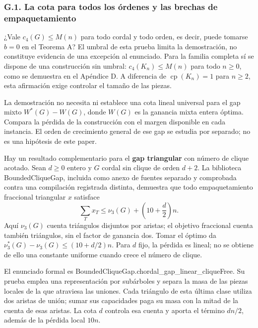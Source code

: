 \documentclass[spanish,11pt,a4paper]{article}
\begin{document}
\subsubsection{G.1. La cota para todos los órdenes y las brechas de empaquetamiento}\label{g.1.-la-cota-para-todos-los-ordenes-y-las-brechas-de-empaquetamiento}

¿Vale \(c_4(G)\le M(n)\) para todo cordal y todo orden, es decir, puede tomarse \(b=0\) en el Teorema A? El umbral de esta prueba limita la demostración, no constituye evidencia de una excepción al enunciado. Para la familia completa sí se dispone de una construcción sin umbral: \(c_4(K_n)\le M(n)\) para todo \(n\ge0\), como se demuestra en el Apéndice D. A diferencia de \(\operatorname{cp}(K_n)=1\) para \(n\ge2\), esta afirmación exige controlar el tamaño de las piezas.

La demostración no necesita ni establece una cota lineal universal para el gap mixto \(W^*(G)-W(G)\), donde \(W(G)\) es la ganancia mixta entera óptima. Compara la pérdida de la construcción con el margen disponible en cada instancia. El orden de crecimiento general de ese gap se estudia por separado; no es una hipótesis de este paper.

Hay un resultado complementario para el \textbf{gap triangular} con número de clique acotado. Sean \(d\ge0\) entero y \(G\) cordal sin clique de orden \(d+2\). La biblioteca {\ttfamily\small BoundedCliqu\discretionary{\hbox{\ensuremath{\hookrightarrow}}}{}{}eGap}, incluida como anexo de fuentes separado y comprobada contra una compilación registrada distinta, demuestra que todo empaquetamiento fraccional triangular \(x\) satisface \[
\sum_T x_T\le \nu_3(G)+\left(10+\frac d2\right)n.
\tag{G.1}
\] Aquí \(\nu_3(G)\) cuenta triángulos disjuntos por aristas; el objetivo fraccional cuenta también triángulos, sin el factor de ganancia dos. Tomar el óptimo da \(\nu_3^*(G)-\nu_3(G)\le(10+d/2)n\). Para \(d\) fijo, la pérdida es lineal; no se obtiene de ello una constante uniforme cuando crece el número de clique.

El enunciado formal es {\ttfamily\small BoundedCliqu\discretionary{\hbox{\ensuremath{\hookrightarrow}}}{}{}eGap.\discretionary{\hbox{\ensuremath{\hookrightarrow}}}{}{}chordal\_\discretionary{\hbox{\ensuremath{\hookrightarrow}}}{}{}gap\_\discretionary{\hbox{\ensuremath{\hookrightarrow}}}{}{}linear\_\discretionary{\hbox{\ensuremath{\hookrightarrow}}}{}{}cliqueFree}. Su prueba emplea una representación por subárboles y separa la masa de las piezas locales de la que atraviesa las uniones. Cada triángulo de esta última clase utiliza dos aristas de unión; sumar sus capacidades paga su masa con la mitad de la cuenta de esas aristas. La cota \(d\) controla esa cuenta y aporta el término \(dn/2\), además de la pérdida local \(10n\).
\end{document}

